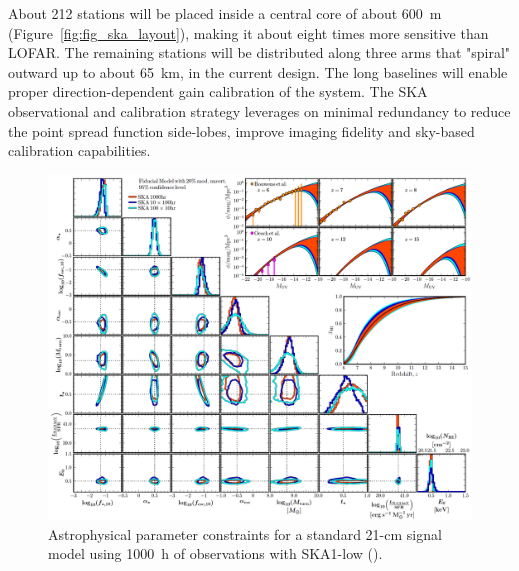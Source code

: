 %
About 212 stations will be placed inside a central core of about 600~m (Figure~\ref{fig:fig_ska_layout}), making it about eight times more sensitive than LOFAR. The remaining stations will be distributed along three arms that "spiral" outward up to about 65~km, in the current design.  The long baselines will enable proper direction-dependent gain calibration of the system. The SKA observational and calibration strategy leverages on minimal redundancy to reduce the point spread function side-lobes, improve imaging fidelity and sky-based calibration capabilities. 
%
\begin{figure}[]
\begin{center}
\includegraphics[width=\textwidth]{Koopmans_Bernardi/SKA-astrophysics.png}
\end{center}
\caption{Astrophysical parameter constraints for a standard 21-cm signal model using 1000~h of observations with SKA1-low (\cite{greig19}).}
\label{fig:fig_ska_astroph}
\end{figure}

